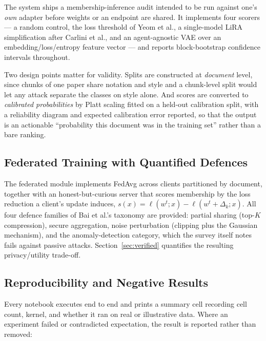\documentclass[11pt,a4paper]{article}
\theoremstyle{plain}
\theoremstyle{definition}
\begin{document}
The system ships a membership-inference audit intended to be run against
one's \emph{own} adapter before weights or an endpoint are shared. It
implements four scorers --- a random control, the loss threshold of Yeom et
al., a single-model LiRA simplification after Carlini et al., and an
agent-agnostic VAE over an embedding/loss/entropy feature vector --- and
reports block-bootstrap confidence intervals throughout.

Two design points matter for validity. Splits are constructed at
\emph{document} level, since chunks of one paper share notation and style and
a chunk-level split would let any attack separate the classes on style alone.
And scores are converted to \emph{calibrated probabilities} by Platt scaling
fitted on a held-out calibration split, with a reliability diagram and
expected calibration error reported, so that the output is an actionable
``probability this document was in the training set'' rather than a bare
ranking.

\subsection{Federated Training with Quantified Defences}

The federated module implements FedAvg across clients partitioned by
document, together with an honest-but-curious server that scores membership
by the loss reduction a client's update induces,
$s(x)=\ell(w^{t};x)-\ell(w^{t}+\Delta_k;x)$. All four defence families of
Bai et al.'s taxonomy are provided: partial sharing (top-$K$ compression),
secure aggregation, noise perturbation (clipping plus the Gaussian
mechanism), and the anomaly-detection category, which the survey itself
notes fails against passive attacks. Section~\ref{sec:verified} quantifies
the resulting privacy/utility trade-off.

\subsection{Reproducibility and Negative Results}

Every notebook executes end to end and prints a summary cell recording cell
count, kernel, and whether it ran on real or illustrative data. Where an
experiment failed or contradicted expectation, the result is reported rather
than removed:
\end{document}
